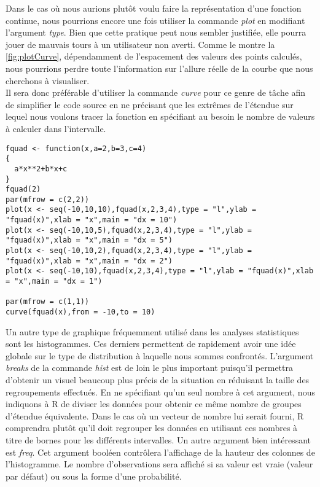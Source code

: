 \vspace{\baselineskip}
Dans le cas où nous aurions plutôt voulu faire la représentation d'une fonction continue, nous pourrions encore une fois utiliser la commande \emph{plot} en modifiant l'argument \emph{type}. Bien que cette pratique peut nous sembler justifiée, elle pourra jouer de mauvais tours à un utilisateur non averti. Comme le montre la \autoref{fig:plotCurve}, dépendamment de l'espacement des valeurs des points calculés, nous pourrions perdre toute l'information sur l'allure réelle de la courbe que nous cherchons à visualiser. \\

Il sera donc préférable d'utiliser la commande \emph{curve} \cite{Rfunction:curve} pour ce genre de tâche afin de simplifier le code source en ne précisant que les extrêmes de l'étendue sur lequel nous voulons tracer la fonction en spécifiant au besoin le nombre de valeurs à calculer dans l'intervalle. \\

\begin{lstlisting}[caption = Utilisation de la commande \emph{curve},label=src:plotCurve]
fquad <- function(x,a=2,b=3,c=4)
{
  a*x**2+b*x+c
}
fquad(2)
par(mfrow = c(2,2))
plot(x <- seq(-10,10,10),fquad(x,2,3,4),type = "l",ylab = "fquad(x)",xlab = "x",main = "dx = 10")
plot(x <- seq(-10,10,5),fquad(x,2,3,4),type = "l",ylab = "fquad(x)",xlab = "x",main = "dx = 5")
plot(x <- seq(-10,10,2),fquad(x,2,3,4),type = "l",ylab = "fquad(x)",xlab = "x",main = "dx = 2")
plot(x <- seq(-10,10),fquad(x,2,3,4),type = "l",ylab = "fquad(x)",xlab = "x",main = "dx = 1")

par(mfrow = c(1,1))
curve(fquad(x),from = -10,to = 10)
\end{lstlisting}



\vspace{\baselineskip}
Un autre type de graphique fréquemment utilisé dans les analyses statistiques sont les histogrammes. Ces derniers permettent de rapidement avoir une idée globale sur le type de distribution à laquelle nous sommes confrontés. L'argument \emph{breaks} de la commande \emph{hist} \cite{Rfunction:hist} est de loin le plus important puisqu'il permettra d'obtenir un visuel beaucoup plus précis de la situation en réduisant la taille des regroupements effectués. En ne spécifiant qu'un seul nombre à cet argument, nous indiquons à R de diviser les données pour obtenir ce même nombre de groupes d'étendue équivalente. Dans le cas où un vecteur de nombre lui serait fourni, R comprendra plutôt qu'il doit regrouper les données en utilisant ces nombres à titre de bornes pour les différents intervalles. Un autre argument bien intéressant est \emph{freq}. Cet argument booléen contrôlera l'affichage de la hauteur des colonnes de l'histogramme. Le nombre d'observations sera affiché si sa valeur est vraie (valeur par défaut) ou sous la forme d'une probabilité. \\

